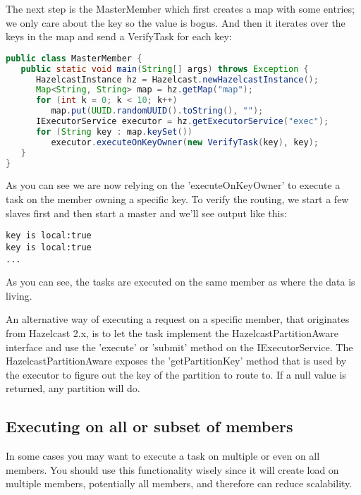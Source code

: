 The next step is the MasterMember which first creates a map with some entries; we only care about the key so the value is bogus. And then it iterates over the keys in the map and send a VerifyTask for each key:
\begin{lstlisting}[language=java]
public class MasterMember {
   public static void main(String[] args) throws Exception {
      HazelcastInstance hz = Hazelcast.newHazelcastInstance();
      Map<String, String> map = hz.getMap("map");
      for (int k = 0; k < 10; k++)
         map.put(UUID.randomUUID().toString(), "");
      IExecutorService executor = hz.getExecutorService("exec");
      for (String key : map.keySet())
         executor.executeOnKeyOwner(new VerifyTask(key), key);
   }
}
\end{lstlisting}
As you can see we are now relying on the 'executeOnKeyOwner' to execute a task on the member owning a specific key. To verify the routing, we start a few slaves first and then start a master and we'll see output like this:
\begin{lstlisting}
key is local:true
key is local:true
...
\end{lstlisting}
As you can see, the tasks are executed on the same member as where the data is living.

An alternative way of executing a request on a specific member, that originates from Hazelcast 2.x, is to let the task implement the HazelcastPartitionAware interface and use the  'execute' or 'submit' method on the IExecutorService. The HazelcastPartitionAware exposes the 'getPartitionKey' method that is used by the executor to figure out the key of the partition to route to. If a null value is returned, any partition will do.

\subsection{Executing on all or subset of members}
In some cases you may want to execute a task on multiple or even on all members. You should use this functionality wisely since it will create load on multiple members, potentially all members, and therefore can reduce scalability.

